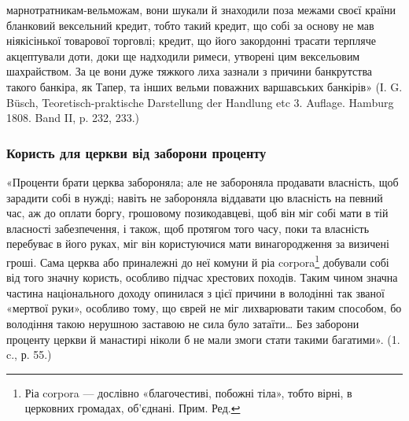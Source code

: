 \parcont{}  %
марнотратникам-вельможам, вони шукали й знаходили поза межами своєї країни
бланковий вексельний кредит, тобто такий кредит, що собі за основу не мав
ніякісінької товарової торговлі; кредит, що його закордонні трасати терпляче
акцептували доти, доки ще надходили римеси, утворені цим вексельовим шахрайством.
За це вони дуже тяжкого лиха зазнали з причини банкрутства такого
банкіра, як Тапер, та інших вельми поважних варшавських банкірів» (І. G. Büsch,
Teoretisch-praktische Darstellung der Handlung etc 3. Auflage. Hamburg 1808. Band
II, p. 232, 233.)

\subsubsection{Користь для церкви від заборони проценту}

«Проценти брати церква забороняла; але не забороняла продавати власність,
щоб зарадити собі в нужді; навіть не забороняла віддавати цю власність
на певний час, аж до оплати боргу, грошовому позикодавцеві, щоб він міг собі
мати в тій власності забезпечення, і також, щоб протягом того часу, поки та
власність перебуває в його руках, міг він користуючися мати винагородження
за визичені гроші. Сама церква або приналежні до неї комуни й ріа corpora\footnote*{
Ріа corpora — дослівно «благочестиві, побожні тіла», тобто вірні, в церковних громадах,
об’єднані. Прим. Ред.
} добували
собі від того значну користь, особливо підчас хрестових походів. Таким
чином значна частина національного доходу опинилася з цієї причини в володінні
так званої «мертвої руки», особливо тому, що єврей не міг лихварювати таким
способом, бо володіння такою нерушною заставою не сила було затаїти\dots{} Без
заборони проценту церкви й манастирі ніколи б не мали змоги стати такими
багатими». (1. c., р. 55.)

